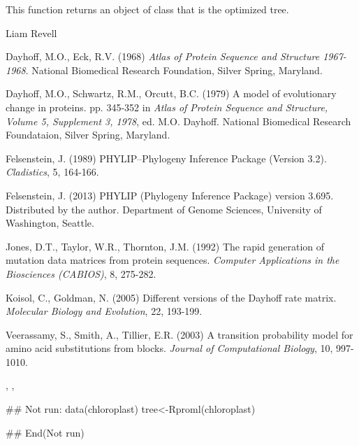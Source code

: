 \documentclass[a4paper]{book}
\begin{document}
%
\begin{Value}
This function returns an object of class  that is the optimized tree.
\end{Value}
%
\begin{Author}\relax
Liam Revell 
\end{Author}
%
\begin{References}\relax
Dayhoff, M.O., Eck, R.V. (1968) \emph{Atlas of Protein Sequence and Structure 1967-1968}. National Biomedical Research Foundation, Silver Spring, Maryland.

Dayhoff, M.O., Schwartz, R.M., Orcutt, B.C. (1979) A model of evolutionary change in proteins. pp. 345-352 in \emph{Atlas of Protein Sequence and Structure, Volume 5, Supplement 3, 1978}, ed. M.O. Dayhoff. National Biomedical Research Foundataion, Silver Spring, Maryland.

Felsenstein, J. (1989) PHYLIP--Phylogeny Inference Package (Version 3.2). \emph{Cladistics}, 5, 164-166.

Felsenstein, J. (2013) PHYLIP (Phylogeny Inference Package) version 3.695. Distributed by the author. Department of Genome Sciences, University of Washington, Seattle.

Jones, D.T., Taylor, W.R., Thornton, J.M. (1992) The rapid generation of mutation data matrices from protein sequences. \emph{Computer Applications in the Biosciences (CABIOS)}, 8, 275-282.

Koisol, C., Goldman, N. (2005) Different versions of the Dayhoff rate matrix. \emph{Molecular Biology and Evolution}, 22, 193-199.

Veerassamy, S., Smith, A., Tillier, E.R. (2003) A transition probability model for amino acid substitutions from blocks. \emph{Journal of Computational Biology}, 10, 997-1010.
\end{References}
%
\begin{SeeAlso}\relax
{}, , 
\end{SeeAlso}
%
\begin{Examples}
\begin{ExampleCode}
## Not run: 
data(chloroplast)
tree<-Rproml(chloroplast)

## End(Not run)
\end{ExampleCode}
\end{Examples}
\end{document}
